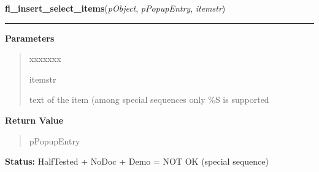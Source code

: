     \label{xformslib:library:fl_insert_select_items}

    \vspace{0.5ex}

\hspace{.8\funcindent}\begin{boxedminipage}{\funcwidth}

    \raggedright \textbf{fl\_insert\_select\_items}(\textit{pObject}, \textit{pPopupEntry}, \textit{itemstr})

    \vspace{-1.5ex}

    \rule{\textwidth}{0.5\fboxrule}
\setlength{\parskip}{2ex}
\setlength{\parskip}{1ex}
      \textbf{Parameters}
      \vspace{-1ex}

      \begin{quote}
        \begin{Ventry}{xxxxxxx}

          \item[itemstr]

          text of the item (among special sequences only \%S is supported

        \end{Ventry}

      \end{quote}

      \textbf{Return Value}
    \vspace{-1ex}

      \begin{quote}
      pPopupEntry

      \end{quote}

\textbf{Status:} HalfTested + NoDoc + Demo = NOT OK (special sequence)



    \end{boxedminipage}

    \label{xformslib:library:fl_replace_select_item}

    \vspace{0.5ex}


